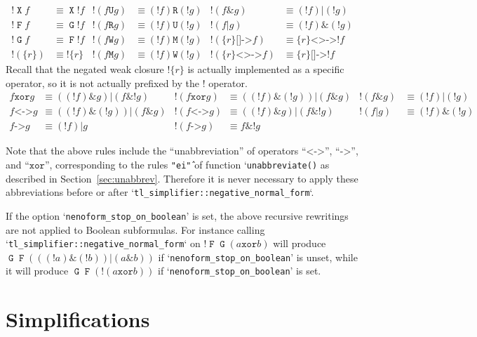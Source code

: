 \documentclass[a4paper,twoside,10pt,DIV=12]{scrreprt}
\DeclareMathOperator{\F}{\texttt{F}}
\DeclareMathOperator{\G}{\texttt{G}}
\newcommand{\U}{\mathbin{\texttt{U}}}
\newcommand{\R}{\mathbin{\texttt{R}}}
\DeclareMathOperator{\X}{\texttt{X}}
\newcommand{\M}{\mathbin{\texttt{M}}}
\newcommand{\W}{\mathbin{\texttt{W}}}
\DeclareMathOperator{\NOT}{\texttt{!}}
\newcommand{\XOR}{\mathbin{\texttt{xor}}}
\newcommand{\IMPLIES}{\mathbin{\texttt{->}}}
\newcommand{\EQUIV}{\mathbin{\texttt{<->}}}
\newcommand{\OR}{\mathbin{\texttt{|}}}
\newcommand{\AND}{\mathbin{\texttt{\&}}}
\newcommand{\0}{\texttt{0}}
\newcommand{\1}{\texttt{1}}
\newcommand{\Esuffix}{\texttt{<>->}}
\newcommand{\Asuffix}{\texttt{[]->}}
\newcommand{\sere}[1]{\texttt{\{}#1\texttt{\}}}
\newcommand{\nsere}[1]{\texttt{!\{}#1\texttt{\}}}
\begin{document}
\begin{align*}
  \NOT\X f & \equiv \X\NOT f &
  \NOT(f \U g) & \equiv (\NOT f) \R (\NOT g) &
  \NOT(f \AND g)&\equiv (\NOT f) \OR (\NOT g)
  \\
  \NOT\F f & \equiv \G\NOT f &
  \NOT(f \R g) & \equiv (\NOT f) \U (\NOT g) &
  \NOT(f \OR g)&\equiv (\NOT f)\AND (\NOT g)
  \\
  \NOT\G f & \equiv \F\NOT f &
  \NOT(f \W g) & \equiv (\NOT f) \M (\NOT g) &
  \NOT(\sere{r} \Asuffix f) &\equiv \sere{r} \Esuffix \NOT f
  \\
  \NOT(\sere{r})&\equiv \nsere{r}&
  \NOT(f \M g) & \equiv (\NOT f) \W (\NOT g)&
  \NOT(\sere{r} \Esuffix f) &\equiv \sere{r} \Asuffix \NOT f
\end{align*}
\noindent Recall that the negated weak closure $\nsere{r}$ is actually
implemented as a specific operator, so it is not actually prefixed by the
$\NOT$ operator.
\begin{align*}
  f \XOR g & \equiv ((\NOT f)\AND g)\OR(f\AND\NOT g) &
  \NOT(f \XOR g) & \equiv ((\NOT f)\AND(\NOT g))\OR(f\AND g) &
  \NOT(f \AND g) & \equiv (\NOT f)\OR(\NOT g) \\
  f \EQUIV g & \equiv ((\NOT f)\AND(\NOT g))\OR(f\AND g) &
  \NOT(f \EQUIV g) & \equiv ((\NOT f)\AND g)\OR(f\AND\NOT g) &
  \NOT(f \OR g) & \equiv (\NOT f)\AND(\NOT g) \\
  f \IMPLIES g & \equiv (\NOT f) \OR g &
  \NOT(f \IMPLIES g) & \equiv f \AND \NOT g
\end{align*}

Note that the above rules include the ``unabbreviation'' of operators
``$\EQUIV$'', ``$\IMPLIES$'', and ``$\XOR$'', corresponding to the
rules \texttt{"ei\^"} of function `\verb=unabbreviate()= as described
in Section~\ref{sec:unabbrev}.  Therefore it is never necessary to
apply these abbreviations before or after
`\verb|tl_simplifier::negative_normal_form|`.

If the option `\verb|nenoform_stop_on_boolean|' is set, the above
recursive rewritings are not applied to Boolean subformulas.  For
instance calling `\verb|tl_simplifier::negative_normal_form|` on
$\NOT\F\G(a \XOR b)$ will produce $\G\F(((\NOT a)\AND(\NOT
b))\OR(a\AND b))$ if `\verb|nenoform_stop_on_boolean|' is unset, while
it will produce $\G\F(\NOT(a \XOR b))$ if
`\verb|nenoform_stop_on_boolean|' is set.

\section{Simplifications}
\end{document}
